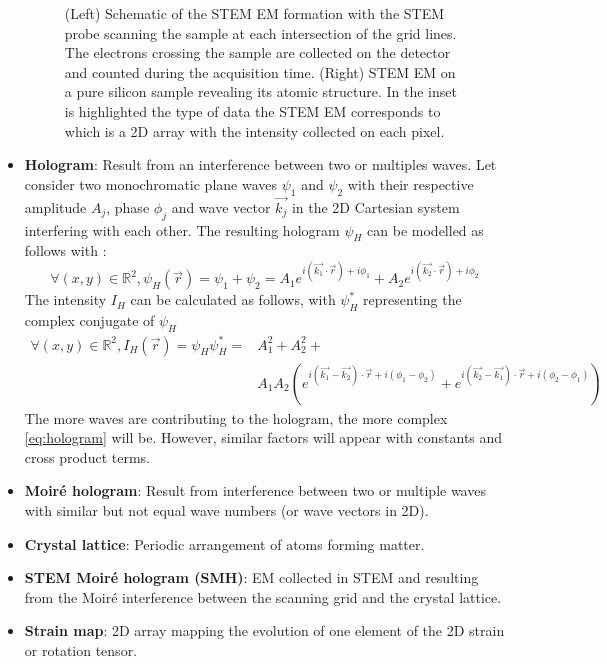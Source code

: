 \documentclass[12pt]{article}
\begin{document}
\begin{itemize}
\begin{figure}[H]
\begin{center}
\caption{(Left) Schematic of the STEM EM formation with the STEM probe scanning 
the sample at each intersection of the grid lines. The electrons crossing the 
sample are collected on the detector and counted during the acquisition time. 
(Right) STEM EM on a pure silicon sample revealing its atomic structure. In the 
inset is highlighted the type of data the STEM EM corresponds to which is a 2D 
array with the intensity collected on each pixel.}
\label{fig:STEM_imaging_Fig}
\end{center}
\end{figure}
\item \textbf{Hologram}: Result from an interference between two or multiples 
waves. \newline
Let consider two monochromatic plane waves $\psi_1$ and $\psi_2$ with their 
respective amplitude $A_j$, phase $\phi_j$ and wave vector $\vec{k_j}$ in the 2D 
Cartesian system interfering with each other. The resulting hologram $\psi_H$  
can be modelled as follows with :
\begin{equation}
\forall (x,y) \in \mathbb{R}^{2}, \psi_H(\vec{r})=\psi_1+\psi_2= 
A_1e^{i(\vec{k_1}\cdot\vec{r})+i\phi_1}+A_2e^{i(\vec{k_2}\cdot\vec{r})+i\phi_2}
\end{equation}
The intensity $I_H$ can be calculated as follows, with $\psi_H^{*}$ representing 
the complex conjugate of $\psi_H$
\begin{equation}
\begin{split}
\forall (x,y) \in \mathbb{R}^{2}, I_H(\vec{r})=\psi_H\psi_H^{*}= & 
A_{1}^{2}+A_{2}^{2}+ \\ & 
A_{1}A_{2}(e^{i(\vec{k_1}-\vec{k_2})\cdot\vec{r}+i(\phi_1-\phi_2)}+e^{i(\vec{k_2}-\vec{k_1})\cdot\vec{r}+i(\phi_2-\phi_1)})
\end{split}
\label{eq:hologram}
\end{equation}
The more waves are contributing to the hologram, the more complex 
\cref{eq:hologram} will be. However, similar factors will appear with constants 
and cross product terms.
\item \textbf{Moir{\'e} hologram}: Result from interference between two or 
multiple waves with similar but not equal wave numbers (or wave vectors in 2D).
\item \textbf{Crystal lattice}: Periodic arrangement of atoms forming matter.
\item \textbf{STEM Moir{\'e} hologram (SMH)}: EM collected in STEM and resulting 
from the 
Moir{\'e} interference between the scanning grid and the crystal lattice. 
\item \textbf{Strain map}: 2D array mapping the evolution of one element of the 
2D strain or rotation 
tensor. 
\end{itemize}
\end{document}
